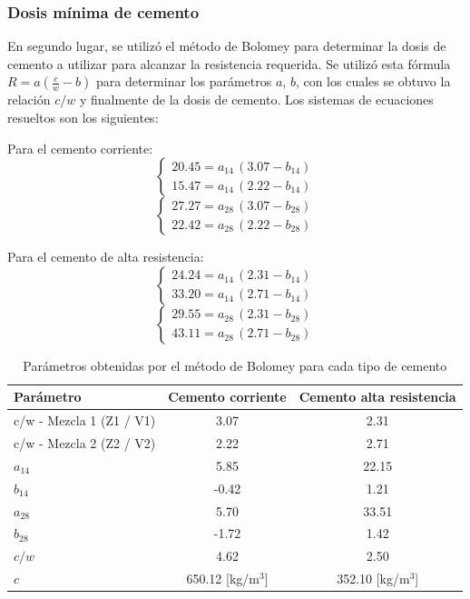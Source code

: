 \subsubsection*{Dosis mínima de cemento}

En segundo lugar, se utilizó el método de Bolomey para determinar la dosis de cemento a utilizar para alcanzar la resistencia requerida. Se utilizó esta fórmula $R = a(\frac{c}{w} - b)$ para determinar los parámetros $a$, $b$, con los cuales se obtuvo la relación $c/w$ y finalmente de la dosis de cemento. Los sistemas de ecuaciones resueltos son los siguientes:

Para el cemento corriente:
\[
\begin{cases}
20.45 = a_{14}\,(3.07 - b_{14}) \\
15.47 = a_{14}\,(2.22 - b_{14})
\end{cases}
\]
\[
\begin{cases}
27.27 = a_{28}\,(3.07 - b_{28}) \\
22.42 = a_{28}\,(2.22 - b_{28})
\end{cases}
\]

Para el cemento de alta resistencia:
\[
\begin{cases}
24.24 = a_{14}\,(2.31 - b_{14}) \\
33.20 = a_{14}\,(2.71 - b_{14})
\end{cases}
\]
\[
\begin{cases}
29.55 = a_{28}\,(2.31 - b_{28}) \\
43.11 = a_{28}\,(2.71 - b_{28})
\end{cases}
\]

\begin{table}[H]
\centering
\caption{Parámetros obtenidas por el método de Bolomey para cada tipo de cemento}
\renewcommand{\arraystretch}{1.15}
\small
\begin{tabular}{lcc}
\hline
Parámetro & Cemento corriente & Cemento alta resistencia \\ \hline
c/w - Mezcla 1 (Z1 / V1) & 3.07 & 2.31 \\
c/w - Mezcla 2 (Z2 / V2) & 2.22 & 2.71 \\
$a_{14}$ & 5.85 & 22.15 \\
$b_{14}$ & -0.42 & 1.21 \\
$a_{28}$ & 5.70 & 33.51 \\
$b_{28}$ & -1.72 & 1.42 \\
$c/w$ & 4.62 & 2.50 \\ 
$c$ & 650.12 [kg/m$^3$] & 352.10 [kg/m$^3$] \\ \hline
\end{tabular}
\end{table}

